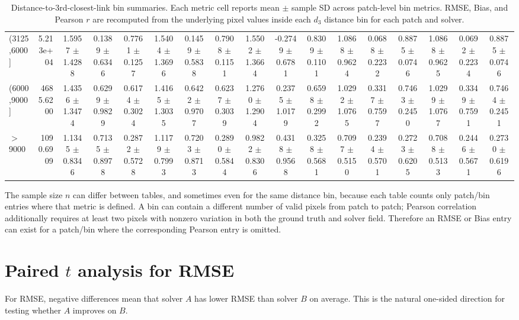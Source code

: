 \documentclass[11pt]{article}
\begin{document}
\begin{table}[H]
{\begin{tabular}{lrccccccccccccccc}
\mbox{(3125,6000]} & 5.213e+04 & 1.5957 $\pm$ 1.4288 & 0.1389 $\pm$ 0.6346 & 0.7761 $\pm$ 0.1257 & 1.5404 $\pm$ 1.3696 & 0.1459 $\pm$ 0.5838 & 0.7908 $\pm$ 0.1151 & 1.5502 $\pm$ 1.3664 & -0.2749 $\pm$ 0.6781 & 0.8309 $\pm$ 0.1101 & 1.0868 $\pm$ 0.9624 & 0.0688 $\pm$ 0.2232 & 0.8875 $\pm$ 0.0746 & 1.0868 $\pm$ 0.9625 & 0.0692 $\pm$ 0.2234 & 0.8875 $\pm$ 0.0746 \\
\mbox{(6000,9000]} & 4685.6200 & 1.4356 $\pm$ 1.3474 & 0.6299 $\pm$ 0.9829 & 0.6174 $\pm$ 0.3024 & 1.4165 $\pm$ 1.3035 & 0.6422 $\pm$ 0.9707 & 0.6237 $\pm$ 0.3039 & 1.2760 $\pm$ 1.2904 & 0.2375 $\pm$ 1.0179 & 0.6598 $\pm$ 0.2992 & 1.0292 $\pm$ 1.0765 & 0.3317 $\pm$ 0.7597 & 0.7463 $\pm$ 0.2450 & 1.0299 $\pm$ 1.0767 & 0.3349 $\pm$ 0.7591 & 0.7464 $\pm$ 0.2451 \\
\mbox{$>$9000} & 1090.6909 & 1.1345 $\pm$ 0.8346 & 0.7135 $\pm$ 0.8978 & 0.2872 $\pm$ 0.5728 & 1.1179 $\pm$ 0.7993 & 0.7203 $\pm$ 0.8713 & 0.2890 $\pm$ 0.5844 & 0.9822 $\pm$ 0.8306 & 0.4318 $\pm$ 0.9568 & 0.3258 $\pm$ 0.5681 & 0.7097 $\pm$ 0.5150 & 0.2394 $\pm$ 0.5701 & 0.2723 $\pm$ 0.6205 & 0.7088 $\pm$ 0.5133 & 0.2446 $\pm$ 0.5671 & 0.2730 $\pm$ 0.6196 \\
\bottomrule
\end{tabular}%
}
\caption{Distance-to-3rd-closest-link bin summaries. Each metric cell reports mean $\pm$ sample SD across patch-level bin metrics. RMSE, Bias, and Pearson $r$ are recomputed from the underlying pixel values inside each $d_3$ distance bin for each patch and solver.}
\end{table}

The sample size $n$ can differ between tables, and sometimes even for the same distance bin, because each table counts only patch/bin entries where that metric is defined. A bin can contain a different number of valid pixels from patch to patch; Pearson correlation additionally requires at least two pixels with nonzero variation in both the ground truth and solver field. Therefore an RMSE or Bias entry can exist for a patch/bin where the corresponding Pearson entry is omitted.

\section*{Paired $t$ analysis for RMSE}
For RMSE, negative differences mean that solver $A$ has lower RMSE than solver $B$ on average. This is the natural one-sided direction for testing whether $A$ improves on $B$.
\end{document}
